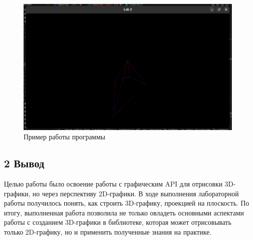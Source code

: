 \documentclass[12pt]{article}
\begin{document}
\begin{figure}[h]

    \centering
        
    \includegraphics[width=0.8\linewidth]{image.png}
        
    \caption{Пример работы программы}
        
    \label{fig:mpr}
        
    \end{figure}
    
\subsection*{2 Вывод}

Целью работы было освоение работы с графическим API для отрисовки 3D-графики, но через перспективу 2D-графики.
В ходе выполнения лабораторной работы получилось понять, как строить 3D-графику, проекцией на плоскость. 
По итогу, выполненная работа позволила не только овладеть основными аспектами работы с созданием 3D-графики в библиотеке, которая может отрисовывать только 2D-графику, но и применить полученные знания на практике.
\end{document}
